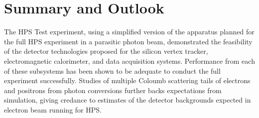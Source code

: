\documentclass[final,3p,times,twocolumn]{elsarticle}
\begin{document}


\section{Summary and Outlook}
The HPS Test experiment, using a simplified version of the apparatus planned for the full HPS 
experiment in a parasitic photon beam, demonstrated the feasibility of the detector technologies 
proposed for the silicon vertex tracker, electromagnetic calorimeter, and data acquisition systems. 
Performance from each of these subsystems has been shown to be adequate to conduct the full 
experiment successfully. Studies of multiple Coloumb scattering tails of electrons and positrons from 
photon conversions further backs expectations from simulation, giving credance to estimates of the 
detector backgrounds expected in electron beam running for HPS.  


\end{document}
